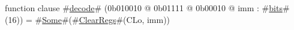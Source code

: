 function clause #\hyperref[sailMIPSzdecode]{decode}# (0b010010 @ 0b01111 @ 0b00010 @ imm : #\hyperref[sailMIPSzbits]{bits}#(16)) = #\hyperref[sailMIPSzSome]{Some}#(#\hyperref[sailMIPSzClearRegs]{ClearRegs}#(CLo,  imm))

